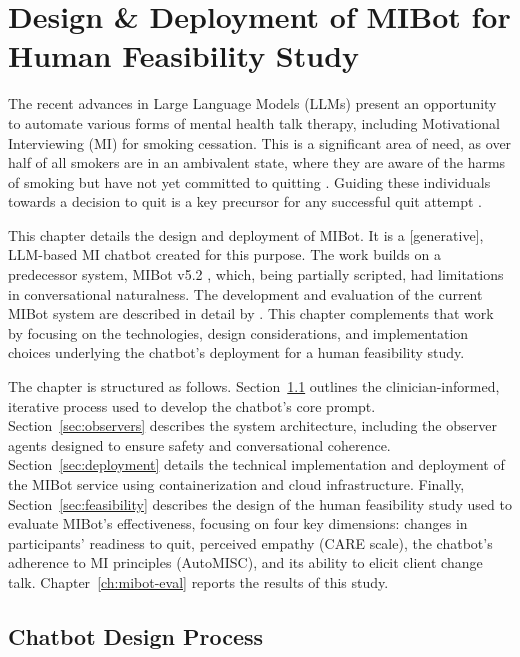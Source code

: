 \chapter{Design \& Deployment of MIBot for Human Feasibility Study}
\label{ch:mibot}

The recent advances in Large Language Models (LLMs) present an opportunity to automate various forms of mental health talk therapy, including Motivational Interviewing (MI) for smoking cessation. This is a significant area of need, as over half of all smokers are in an ambivalent state, where they are aware of the harms of smoking but have not yet committed to quitting \citep{Babb2017}. Guiding these individuals towards a decision to quit is a key precursor for any successful quit attempt \citep{West2006}.

This chapter details the design and deployment of MIBot. It is a [generative], LLM-based MI chatbot created for this purpose. The work builds on a predecessor system, MIBot v5.2 \citep{info:doi/10.2196/49132}, which, being partially scripted, had limitations in conversational naturalness. The development and evaluation of the current MIBot system are described in detail by \citet{mahmood-etal-2025-fully}. This chapter complements that work by focusing on the technologies, design considerations, and implementation choices underlying the chatbot's deployment for a human feasibility study.

The chapter is structured as follows. Section~\ref{sec:iterative-development} outlines the clinician-informed, iterative process used to develop the chatbot's core prompt. Section~\ref{sec:observers} describes the system architecture, including the observer agents designed to ensure safety and conversational coherence. Section~\ref{sec:deployment} details the technical implementation and deployment of the MIBot service using containerization and cloud infrastructure. Finally, Section~\ref{sec:feasibility} describes the design of the human feasibility study used to evaluate MIBot's effectiveness, focusing on four key dimensions: changes in participants' readiness to quit, perceived empathy (CARE scale), the chatbot's adherence to MI principles (AutoMISC), and its ability to elicit client change talk. Chapter~\ref{ch:mibot-eval} reports the results of this study.




\section{Chatbot Design Process}
\label{sec:iterative-development}

